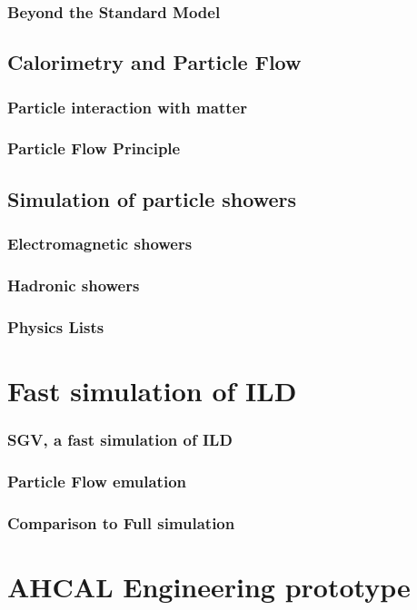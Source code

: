 \documentclass[a4paper,12pt]{report}
\begin{document}
\subsection{Beyond the Standard Model}
\section{Calorimetry and Particle Flow}
\subsection{Particle interaction with matter}
\subsection{Particle Flow Principle}
\section{Simulation of particle showers}
\subsection{Electromagnetic showers}
\subsection{Hadronic showers}
\subsection{Physics Lists}

\chapter{Fast simulation of ILD}
\subsection{SGV, a fast simulation of ILD}
\subsection{Particle Flow emulation}
\subsection{Comparison to Full simulation}

\newpage

\chapter{AHCAL Engineering prototype}
\end{document}
